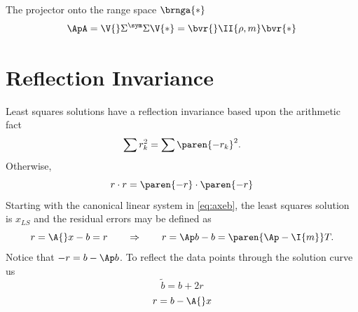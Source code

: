 The projector onto the range space $\brnga{*}$
  \begin{equation*}   %
      \ApA = \V{}\Sigma^{\sym}\Sigma{}\V{*} = \bvr{} \II{\rho,m} \bvr{*}
  \end{equation*}

\section{\label{sec:reflection invariance}Reflection Invariance}  %
Least squares solutions have a reflection invariance based upon the arithmetic fact 
  \begin{equation*}   %
    \sum r_{k}^{2} = \sum \paren{-r_{k}}^{2}.
  \end{equation*}
Otherwise,
  \begin{equation*}   %
    r \cdot r = \paren{-r} \cdot \paren{-r}
  \end{equation*}
Starting with the canonical linear system in \eqref{eq:axeb}, the least squares solution is $x_{LS}$ and the residual errors may be defined as
  \begin{equation*}   %
    r = \A{}x - b = r \qquad \Rightarrow \qquad r = \Ap b - b = \paren{\Ap - \I{m}}T.
  \end{equation*}
Notice that $-r = b - \Ap b$. To reflect the data points through the solution curve us
  \begin{equation*}   %
    \tilde{b} = b + 2r
  \end{equation*}
  \begin{equation*}   %
      r = b - \A{}x 
  \end{equation*}

